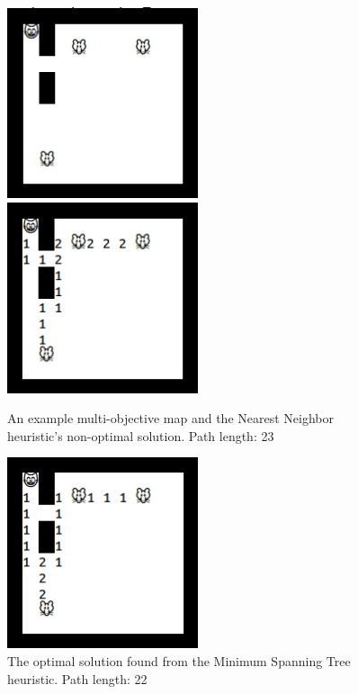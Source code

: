 \documentclass[12pt, conference, compsocconf]{IEEEtran}
\begin{document}
\begin{figure}[ht]
    \centering
    \includegraphics[width=0.5\textwidth]{map_mo.jpg}
    \includegraphics[width=0.5\textwidth]{map_mo_nonopt.jpg}
    \caption{An example multi-objective map and the Nearest Neighbor
heuristic's non-optimal solution.  Path length: 23}
    \label{nonopt}
\end{figure}
\begin{figure}[ht]
    \centering
    \includegraphics[width=0.5\textwidth]{map_mo_opt.jpg}
    \caption{The optimal solution found from the Minimum Spanning Tree
heuristic.  Path length: 22}
    \label{opt}
\end{figure}
\end{document}
